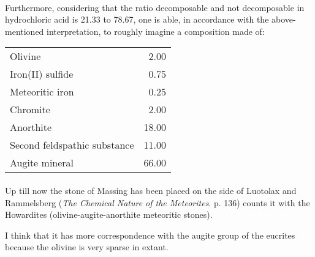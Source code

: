 \documentclass[a4paper, 12pt, oneside]{article}
\begin{document}
\paragraph{}
Furthermore, considering that the ratio decomposable and not decomposable in hydrochloric acid is 21.33 to 78.67, one is able, in accordance with the above-mentioned interpretation, to roughly imagine a composition made of: 
\begin{center}
    \begin{tabular}{l r}
        Olivine & 2.00\\
        Iron(II) sulfide & 0.75\\
        Meteoritic iron & 0.25\\
        Chromite & 2.00\\
        Anorthite & 18.00\\
        Second feldspathic substance & 11.00\\
        Augite mineral & 66.00\\
    \end{tabular}
\end{center}
\paragraph{}
Up till now the stone of Massing has been placed on the side of Luotolax and Rammelsberg (\emph{The Chemical Nature of the Meteorites}. p. 136) counts it with the Howardites (olivine-augite-anorthite meteoritic stones).

I think that it has more correspondence with the augite group of the eucrites because the olivine is very sparse in extant.
\end{document}
